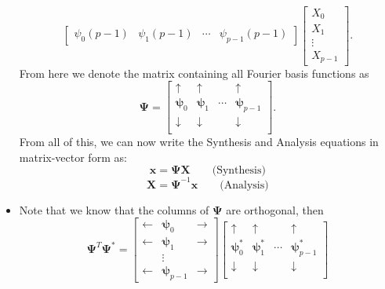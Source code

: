 \begin{itemize}
\[\begin{bmatrix}
			      \psi_{0}(p-1) & \psi_{1}(p-1) & \cdots & \psi_{p-1}(p-1)
		      \end{bmatrix}
		      \begin{bmatrix}
			      X_{0}  \\
			      X_{1}  \\
			      \vdots \\
			      X_{p-1}
		      \end{bmatrix}
		      .\]
	      From here we denote the matrix containing all Fourier basis functions as
	      \[
		      \bm{\Psi} =
		      \begin{bmatrix}
			      \uparrow      & \uparrow      & {}     & \uparrow        \\
			      \bm{\psi}_{0} & \bm{\psi}_{1} & \cdots & \bm{\psi}_{p-1} \\
			      \downarrow    & \downarrow    & {}     & \downarrow      \\
		      \end{bmatrix}
		      .\]
	      From all of this, we can now write the Synthesis and Analysis equations in
	      matrix-vector form as:
	      \begin{equation*}
		      \bm{x} = \bm{\Psi} \bm{X} \qquad \text{(Synthesis)}
	      \end{equation*}
	      \begin{equation*}
		      \bm{X} = \bm{\Psi}^{-1} \bm{x} \qquad \text{(Analysis)}
	      \end{equation*}
	\item Note that we know that the columns of $\bm{\Psi}$ are orthogonal, then
	      \[
		      \bm{\Psi}^T\bm{\Psi}^* =
		      \begin{bmatrix}
			      \leftarrow & \bm{\psi}_{0}   & \rightarrow \\
			      \leftarrow & \bm{\psi}_{1}   & \rightarrow \\
			                 & \vdots          &             \\
			      \leftarrow & \bm{\psi}_{p-1} & \rightarrow
		      \end{bmatrix}
		      \begin{bmatrix}
			      \uparrow        & \uparrow        & {}     & \uparrow          \\
			      \bm{\psi}_{0}^* & \bm{\psi}_{1}^* & \cdots & \bm{\psi}_{p-1}^* \\
			      \downarrow      & \downarrow      & {}     & \downarrow        \\
		      \end{bmatrix}
\]
\end{itemize}
